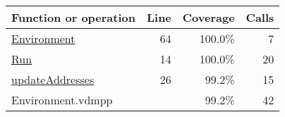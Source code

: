 \bigskip
\begin{longtable}{|l|r|r|r|}
\hline
Function or operation & Line & Coverage & Calls \\
\hline
\hline
\hyperref[Environment:64]{Environment} & 64&100.0\% & 7 \\
\hline
\hyperref[Run:14]{Run} & 14&100.0\% & 20 \\
\hline
\hyperref[updateAddresses:26]{updateAddresses} & 26&99.2\% & 15 \\
\hline
\hline
Environment.vdmpp & & 99.2\% & 42 \\
\hline
\end{longtable}

